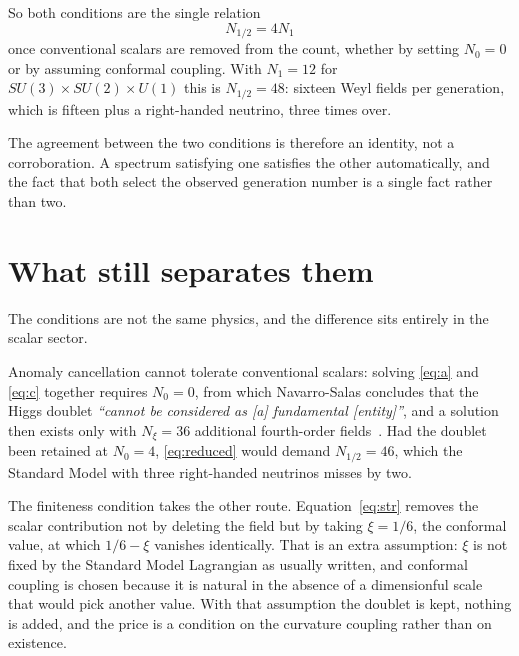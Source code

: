 \documentclass[aps,prd,twocolumn,superscriptaddress,nofootinbib,10pt]{revtex4-2}
\begin{document}
So both conditions are the single relation
%
\begin{equation}
  \boxed{\;N_{1/2} = 4 N_1\;}
  \label{eq:same}
\end{equation}
%
once conventional scalars are removed from the count, whether by setting $N_0 = 0$ or by assuming
conformal coupling. With $N_1 = 12$ for $SU(3) \times SU(2) \times U(1)$ this is
$N_{1/2} = 48$: sixteen Weyl fields per generation, which is fifteen plus a right-handed neutrino,
three times over.

The agreement between the two conditions is therefore an identity, not a corroboration. A
spectrum satisfying one satisfies the other automatically, and the fact that both select the
observed generation number is a single fact rather than two.

\section{What still separates them}\label{sec:separate}

The conditions are not the same physics, and the difference sits entirely in the scalar sector.

Anomaly cancellation cannot tolerate conventional scalars: solving \eqref{eq:a} and \eqref{eq:c}
together requires $N_0 = 0$, from which Navarro-Salas concludes that the Higgs doublet
\emph{``cannot be considered as [a] fundamental [entity]''}, and a solution then exists only with
$N_\xi = 36$ additional fourth-order fields~\cite{NavarroSalas2024}. Had the doublet been retained
at $N_0 = 4$, \eqref{eq:reduced} would demand $N_{1/2} = 46$, which the Standard Model with three
right-handed neutrinos misses by two.

The finiteness condition takes the other route. Equation~\eqref{eq:str} removes the scalar
contribution not by deleting the field but by taking $\xi = 1/6$, the conformal value, at which
$1/6 - \xi$ vanishes identically. That is an extra assumption: $\xi$ is not fixed by the Standard
Model Lagrangian as usually written, and conformal coupling is chosen because it is natural in the
absence of a dimensionful scale that would pick another value. With that assumption the doublet is
kept, nothing is added, and the price is a condition on the curvature coupling rather than on
existence.
\end{document}
